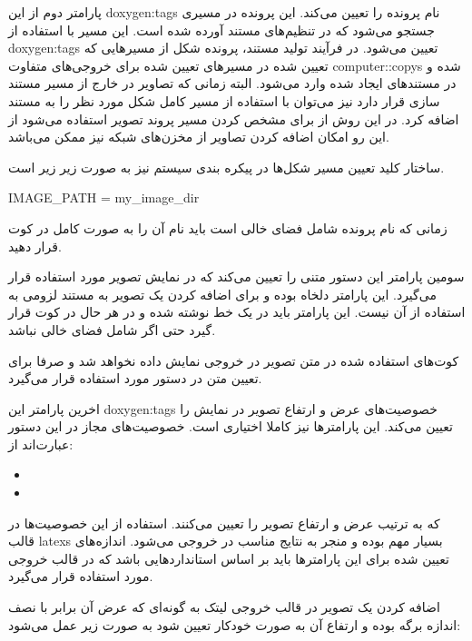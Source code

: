 پارامتر دوم از این \glspl{doxygen:tag} نام پرونده‌ را تعیین می‌کند.  این پرونده
در مسیری جستجو می‌شود که در تنظیم‌های مستند آورده شده است. این مسیر با استفاده
از \glspl{doxygen:tag}  تعیین می‌شود. در فرآیند تولید مستند،
پرونده شکل از مسیرهایی که تعیین شده در مسیرهای تعیین شده برای خروجی‌های متفاوت
\glspl{computer::copy} شده و در مستند‌های ایجاد شده وارد می‌شود. البته زمانی که تصاویر در
خارج از مسیر مستند سازی قرار دارد نیز می‌توان با استفاده از مسیر کامل شکل مورد
نظر را به مستند اضافه کرد. در این روش از  برای مشخص کردن مسیر پروند
تصویر استفاده می‌شود از این رو امکان اضافه کردن تصاویر از مخزن‌های شبکه نیز ممکن می‌باشد.

ساختار کلید تعیین مسیر شکل‌ها در پیکره بندی سیستم نیز به صورت زیر زیر است.

\begin{doxygen}
IMAGE_PATH = my_image_dir
\end{doxygen}

\begin{note}
زمانی که نام پرونده شامل فضای خالی است باید نام آن را به صورت کامل در کوت
قرار دهید.
\end{note}

سومین پارامتر این دستور متنی را تعیین می‌کند که در نمایش تصویر مورد
استفاده قرار می‌گیرد. این پارامتر دلخاه بوده و برای اضافه کردن یک تصویر به مستند
لزومی به استفاده از آن نیست. این پارامتر باید در یک خط نوشته شده و در هر حال در
کوت قرار گیرد حتی اگر شامل فضای خالی نباشد.

\begin{note}
کوت‌های استفاده شده در متن تصویر در خروجی نمایش داده نخواهد شد و صرفا برای
تعیین متن در دستور مورد استفاده قرار می‌گیرد.
\end{note}

اخرین پارامتر این \glspl{doxygen:tag} خصوصیت‌های عرض و ارتفاع تصویر در نمایش را
تعیین می‌کند. این پارامترها نیز کاملا اختیاری است. خصوصیت‌های مجاز در این دستور
عبارت‌اند از:

\begin{itemize}
  \item {}
  \item {}
\end{itemize}

که به ترتیب عرض و ارتفاع تصویر را تعیین می‌کنند. استفاده از این خصوصیت‌ها در
قالب \glspl{latex} بسیار مهم بوده و منجر به نتایج مناسب در خروجی می‌شود.
اندازه‌های تعیین شده برای این پارامترها باید بر اساس استانداردهایی باشد که در قالب خروجی مورد
استفاده قرار می‌گیرد.

اضافه کردن یک تصویر در قالب خروجی لیتک به گونه‌ای که عرض آن برابر با نصف اندازه
برگه بوده و ارتفاع آن به صورت خودکار تعیین شود به صورت زیر عمل می‌شود:

